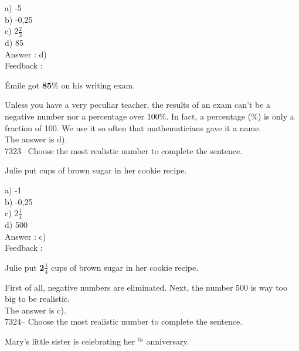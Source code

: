 \documentclass[letterpaper, 12pt]{article}
\begin{document}
a) -5\\
b) -0,25\\
c) 2$\frac{2}{3}$\\
d) 85\\

Answer : d)\\

Feedback :\\
\begin{center}
\'Emile got \textbf{85}\% on his writing exam.\\
\end{center}

Unless you have a very peculiar teacher, the results of an exam can't be a negative number nor a percentage over 100\%. In fact, a percentage (\%) is only a fraction of 100. We use it so often that mathematicians gave it a name.\\
The answer is d).\\

7323-- Choose the most realistic number to complete the sentence.\\ 
\begin{center}
Julie put \underline{\quad\quad} cups of brown sugar in her cookie recipe. \\
\end{center}

a) -1\\
b) -0,25\\
c) 2$\frac{1}{4}$\\
d) 500\\

Answer : c)\\

Feedback :\\
\begin{center}
Julie put \textbf{2$\frac{1}{4}$} cups of brown sugar in her cookie recipe.\\
\end{center}

First of all, negative numbers are eliminated. Next, the number 500 is way too big to be realistic.\\
The answer is c).\\



7324-- Choose the most realistic number to complete the sentence.\\ 
\begin{center}
Mary's little sister is celebrating her\underline{\quad\quad} $^{th}$ anniversary.\\
\end{center}
\end{document}
